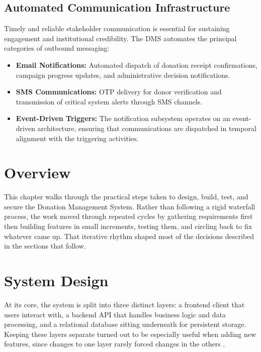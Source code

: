 \documentclass{thesis-library}
\begin{document}
\subsection{Automated Communication Infrastructure}

Timely and reliable stakeholder communication is essential for sustaining engagement and institutional credibility. The DMS automates the principal categories of outbound messaging:
\begin{itemize}
    \item \textbf{Email Notifications:} Automated dispatch of donation receipt confirmations, campaign progress updates, and administrative decision notifications.
    \item \textbf{SMS Communications:} OTP delivery for donor verification and transmission of critical system alerts through SMS channels.
    \item \textbf{Event-Driven Triggers:} The notification subsystem operates on an event-driven architecture, ensuring that communications are dispatched in temporal alignment with the triggering activities.
\end{itemize}

\section{Overview}
This chapter walks through the practical steps taken to design, build, test, and secure the Donation Management System. Rather than following a rigid waterfall process, the work moved through repeated cycles by gathering requirements first then building features in small increments, testing them, and circling back to fix whatever came up. That iterative rhythm shaped most of the decisions described in the sections that follow.

\section{System Design}
At its core, the system is split into three distinct layers: a frontend client that users interact with, a backend API that handles business logic and data processing, and a relational database sitting underneath for persistent storage. Keeping these layers separate turned out to be especially useful when adding new features, since changes to one layer rarely forced changes in the others \cite{jones2023modern}.
\end{document}
